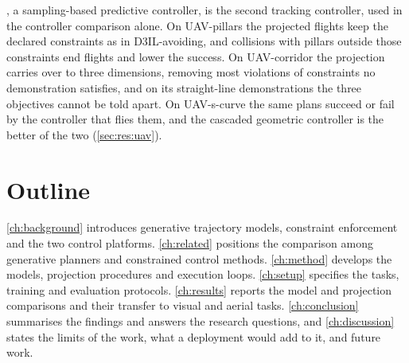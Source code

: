 \begin{enumerate}
    \parencite{howell2022predictive}, a sampling-based predictive controller, is the second tracking
    controller, used in the controller comparison alone.
    On UAV-pillars the projected flights keep the declared constraints as in D3IL-avoiding, and
    collisions with pillars outside those constraints end flights and lower the success. On
    UAV-corridor the projection carries over to three dimensions, removing most violations of
    constraints no demonstration satisfies, and on its straight-line demonstrations the three
    objectives cannot be told apart. On UAV-s-curve the same plans succeed or fail by the controller
    that flies them, and the cascaded geometric controller is the better of the two
    (\autoref{sec:res:uav}).
\end{enumerate}

\section{Outline}\label{sec:intro:outline}

\autoref{ch:background} introduces generative trajectory models, constraint enforcement and the two
control platforms. \autoref{ch:related} positions the comparison among generative planners and
constrained control methods. \autoref{ch:method} develops the models, projection procedures and
execution loops. \autoref{ch:setup} specifies the tasks, training and evaluation protocols.
\autoref{ch:results} reports the model and projection comparisons and their transfer to visual and
aerial tasks. \autoref{ch:conclusion} summarises the findings and answers the research questions, and
\autoref{ch:discussion} states the limits of the work, what a deployment would add to it, and future
work.
